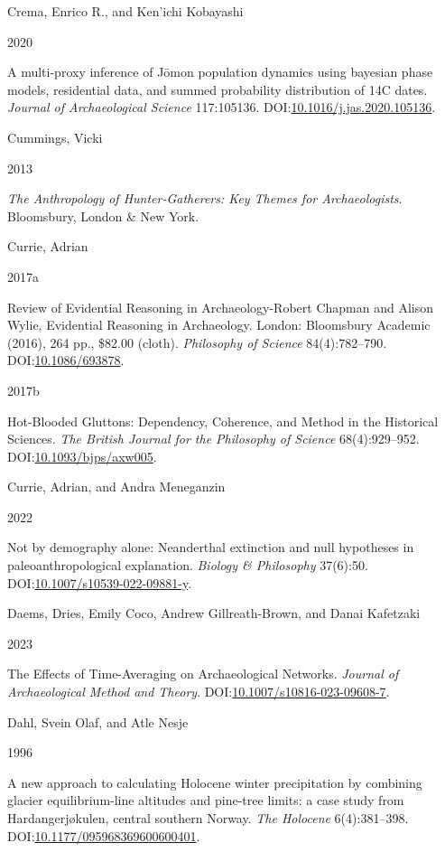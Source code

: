 \documentclass[
  12pt,
  a4paper,
  oneside]{book}
\newlength{\cslhangindent}
\newlength{\csllabelwidth}
\newlength{\cslentryspacingunit} %
\newenvironment{CSLReferences}[2] %
 {%
  \setlength{\parindent}{0pt}
  \ifodd #1
  \let\oldpar\par
  \def\par{\hangindent=\cslhangindent\oldpar}
  \fi
  \setlength{\parskip}{#2\cslentryspacingunit}
 }%
 {}
\newcommand{\CSLBlock}[1]{#1\hfill\break}
\newcommand{\CSLLeftMargin}[1]{\parbox[t]{\csllabelwidth}{#1}}
\newcommand{\CSLRightInline}[1]{\parbox[t]{\linewidth - \csllabelwidth}{#1}\break}
\begin{document}
\begin{CSLReferences}{0}{0}
\leavevmode{}%
\CSLBlock{Crema, Enrico R., and Ken'ichi Kobayashi}
\CSLLeftMargin{ 2020}
\CSLRightInline{{A multi-proxy inference of Jōmon population dynamics using bayesian phase models, residential data, and summed probability distribution of 14C dates}. \emph{Journal of Archaeological Science} 117:105136. DOI:\href{https://doi.org/10.1016/j.jas.2020.105136}{10.1016/j.jas.2020.105136}.}

\leavevmode{}%
\CSLBlock{Cummings, Vicki}
\CSLLeftMargin{ 2013}
\CSLRightInline{\emph{{The Anthropology of Hunter-Gatherers: Key Themes for Archaeologists}}. Bloomsbury, London \& New York.}

\leavevmode{}%
\CSLBlock{Currie, Adrian}
\CSLLeftMargin{ 2017a}
\CSLRightInline{{Review of Evidential Reasoning in Archaeology-Robert Chapman and Alison Wylie, Evidential Reasoning in Archaeology. London: Bloomsbury Academic (2016), 264 pp., \$82.00 (cloth)}. \emph{Philosophy of Science} 84(4):782--790. DOI:\href{https://doi.org/10.1086/693878}{10.1086/693878}.}

\leavevmode{}%
\CSLLeftMargin{ 2017b }
\CSLRightInline{{Hot-Blooded Gluttons: Dependency, Coherence, and Method in the Historical Sciences}. \emph{The British Journal for the Philosophy of Science} 68(4):929--952. DOI:\href{https://doi.org/10.1093/bjps/axw005}{10.1093/bjps/axw005}.}

\leavevmode{}%
\CSLBlock{Currie, Adrian, and Andra Meneganzin}
\CSLLeftMargin{ 2022}
\CSLRightInline{Not by demography alone: Neanderthal extinction and null hypotheses in paleoanthropological explanation. \emph{Biology \& Philosophy} 37(6):50. DOI:\href{https://doi.org/10.1007/s10539-022-09881-y}{10.1007/s10539-022-09881-y}.}

\leavevmode{}%
\CSLBlock{Daems, Dries, Emily Coco, Andrew Gillreath-Brown, and Danai Kafetzaki}
\CSLLeftMargin{ 2023}
\CSLRightInline{{The Effects of Time-Averaging on Archaeological Networks}. \emph{Journal of Archaeological Method and Theory}. DOI:\href{https://doi.org/10.1007/s10816-023-09608-7}{10.1007/s10816-023-09608-7}.}

\leavevmode{}%
\CSLBlock{Dahl, Svein Olaf, and Atle Nesje}
\CSLLeftMargin{ 1996}
\CSLRightInline{{A new approach to calculating Holocene winter precipitation by combining glacier equilibrium-line altitudes and pine-tree limits: a case study from Hardangerjøkulen, central southern Norway}. \emph{The Holocene} 6(4):381--398. DOI:\href{https://doi.org/10.1177/095968369600600401}{10.1177/095968369600600401}.}


\end{CSLReferences}
\end{document}
